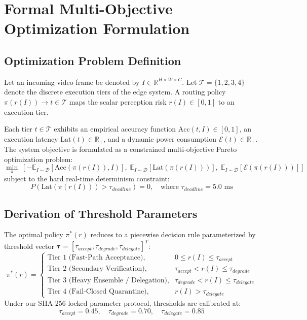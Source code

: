 \documentclass[10pt,journal,compsoc]{IEEEtran}
\begin{document}
\section{Formal Multi-Objective Optimization Formulation}

\subsection{Optimization Problem Definition}
Let an incoming video frame be denoted by $I \in \mathbb{R}^{H \times W \times C}$. Let $\mathcal{T} = \{1, 2, 3, 4\}$ denote the discrete execution tiers of the edge system. A routing policy $\pi(r(I)) \to t \in \mathcal{T}$ maps the scalar perception risk $r(I) \in [0, 1]$ to an execution tier.

Each tier $t \in \mathcal{T}$ exhibits an empirical accuracy function $\text{Acc}(t, I) \in [0, 1]$, an execution latency $\text{Lat}(t) \in \mathbb{R}_+$, and a dynamic power consumption $\mathcal{E}(t) \in \mathbb{R}_+$. The system objective is formulated as a constrained multi-objective Pareto optimization problem:
\begin{equation}
\min_{\pi} \; \left[ -\mathbb{E}_{I \sim \mathcal{D}}[\text{Acc}(\pi(r(I)), I)], \; \mathbb{E}_{I \sim \mathcal{D}}[\text{Lat}(\pi(r(I)))], \; \mathbb{E}_{I \sim \mathcal{D}}[\mathcal{E}(\pi(r(I)))] \right]
\end{equation}
subject to the hard real-time determinism constraint:
\begin{equation}
P\left( \text{Lat}(\pi(r(I))) > \tau_{deadline} \right) = 0, \quad \text{where } \tau_{deadline} = 5.0\text{ ms}
\end{equation}

\subsection{Derivation of Threshold Parameters}
The optimal policy $\pi^*(r)$ reduces to a piecewise decision rule parameterized by threshold vector $\boldsymbol{\tau} = [\tau_{accept}, \tau_{degrade}, \tau_{delegate}]^T$:
\begin{equation}
\pi^*(r) = 
\begin{cases}
\text{Tier 1 (Fast-Path Acceptance)}, & 0 \le r(I) \le \tau_{accept} \\
\text{Tier 2 (Secondary Verification)}, & \tau_{accept} < r(I) \le \tau_{degrade} \\
\text{Tier 3 (Heavy Ensemble / Delegation)}, & \tau_{degrade} < r(I) \le \tau_{delegate} \\
\text{Tier 4 (Fail-Closed Quarantine)}, & r(I) > \tau_{delegate}
\end{cases}
\end{equation}
Under our SHA-256 locked parameter protocol, thresholds are calibrated at:
\begin{equation}
\tau_{accept} = 0.45, \quad \tau_{degrade} = 0.70, \quad \tau_{delegate} = 0.85
\end{equation}
\end{document}
